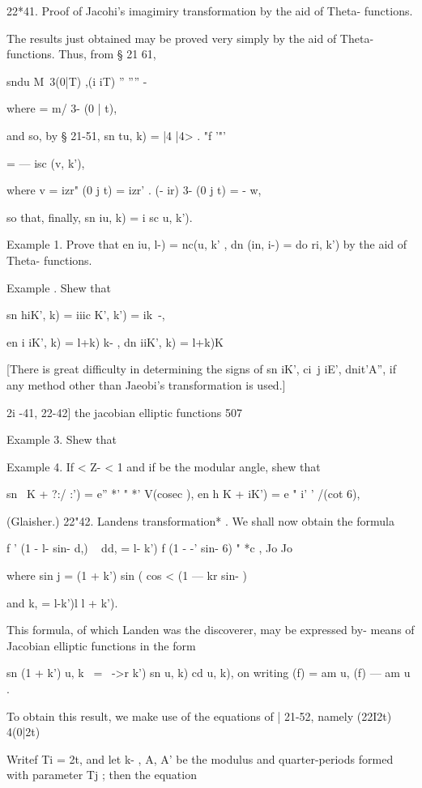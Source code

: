 22*41. Proof of Jacohi's imagimiry transformation by the aid of Theta-
functions.

The results just obtained may be proved very simply by the aid of
Theta-functions. Thus, from § 21 61,

sndu M\ 3(0|T) ,(i iT) '' '''' -%

where = m/ 3- (0 | t),

and so, by § 21-51, sn tu, k) = |4 |4> . "f '"'

= — isc (v, k'),

where v = izr" (0 j t) = izr' . (- ir) 3- (0 j t) = - w,

so that, finally, sn iu, k) = i sc u, k').

Example 1. Prove that en iu, l-) = nc(u, k' , dn (in, i-) = do ri, k')
by the aid of Theta- functions.

Example . Shew that

sn hiK', k) = iiic K', k') = ik~-,

en i iK', k) = l+k) k- , dn iiK', k) = l+k)K

[There is great difficulty in determining the signs of sn iK', ci\ j
iE', dnit'A'', if any method other than Jaeobi's transformation is
used.]



2i -41, 22-42] the jacobian elliptic functions 507

Example 3. Shew that

Example 4. If < Z- < 1 and if be the modular angle, shew that

sn \ K + ?:/ :') = e'' *' " *' V(cosec ), en h K + iK') = e " i' '
/(cot 6),

(Glaisher.) 22"42. Landens transformation* . We shall now obtain the
formula

f ' (1 - l- sin- d,) ~ dd, = l- k') f (1 - -' sin- 6) " *c , Jo Jo

where sin j = (1 + k') sin ( cos < (1 — kr sin- ) ~

and k, = l-k')l l + k').

This formula, of which Landen was the discoverer, may be expressed by-
means of Jacobian elliptic functions in the form

sn (1 + k') u, k \ = \ ->r k') sn u, k) cd u, k), on writing (f) = am
u, (f) — am u .

To obtain this result, we make use of the equations of | 21-52, namely
(22I2t) 4(0|2t)

Writef Ti = 2t, and let k- , A, A' be the modulus and quarter-periods
formed with parameter Tj ; then the equation

